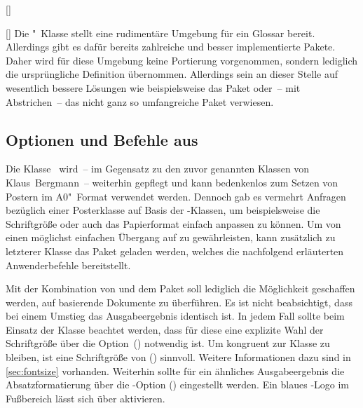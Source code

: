\begin{Entity'}{}
\begin{Declaration}{[]}
\begin{Declaration}{[]}
\printdeclarationlist%
%
Die "~Klasse stellt eine rudimentäre Umgebung für ein Glossar 
bereit. Allerdings gibt es dafür bereits zahlreiche und besser implementierte 
Pakete. Daher wird für diese Umgebung keine Portierung vorgenommen, sondern 
lediglich die ursprüngliche Definition übernommen. Allerdings sein an dieser 
Stelle auf wesentlich bessere Lösungen wie beispielsweise das Paket 
 oder~-- mit Abstrichen~-- das nicht ganz so umfangreiche 
Paket  verwiesen.
\end{Declaration}
\end{Declaration}
%



\subsection{Optionen und Befehle aus }
%
%
Die Klasse~ wird~-- im Gegensatz zu den zuvor genannten 
Klassen von Klaus~Bergmann~-- weiterhin gepflegt und kann bedenkenlos zum 
Setzen von Postern im A0"~Format verwendet werden. Dennoch gab es vermehrt 
Anfragen bezüglich einer Posterklasse auf Basis der \TUDScript-Klassen, um 
beispielsweise die Schriftgröße oder auch das Papierformat einfach anpassen zu 
können. Um von  einen möglichst einfachen Übergang auf 
 zu gewährleisten, kann zusätzlich zu letzterer Klasse das 
Paket  geladen werden, welches die nachfolgend erläuterten 
Anwenderbefehle bereitstellt.

Mit der Kombination von  und dem Paket 
soll lediglich die Möglichkeit geschaffen werden, auf  
basierende Dokumente zu überführen. Es ist nicht beabsichtigt, dass bei einem 
Umstieg das Ausgabeergebnis identisch ist. In jedem Fall sollte beim Einsatz 
der Klasse  beachtet werden, dass für diese eine explizite 
Wahl der Schriftgröße über die Option~() 
notwendig ist. Um kongruent zur Klasse  zu bleiben, ist 
eine Schriftgröße von () 
sinnvoll. Weitere Informationen dazu sind in \autoref{sec:fontsize} vorhanden. 
Weiterhin sollte für ein ähnliches Ausgabeergebnis die Absatzformatierung über 
die \KOMAScript-Option () 
eingestellt werden. Ein blaues \DDC-Logo im Fußbereich lässt sich über 
 aktivieren.


\end{Entity'}
